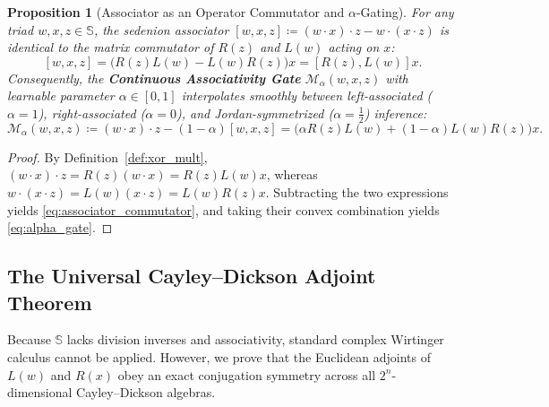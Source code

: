 \documentclass[11pt,a4paper]{article}
\newtheorem{proposition}[theorem]{Proposition}
\theoremstyle{definition}
\theoremstyle{remark}
\newcommand{\Se}{\mathbb{S}}
\begin{document}
\begin{proposition}[Associator as an Operator Commutator and $\alpha$-Gating]
\label{prop:associator}
For any triad $w, x, z \in \Se$, the sedenion associator $[w, x, z] \coloneqq (w \cdot x) \cdot z - w \cdot (x \cdot z)$ is identical to the matrix commutator of $R(z)$ and $L(w)$ acting on $x$:
\begin{equation}
\label{eq:associator_commutator}
[w, x, z] = \big(R(z)L(w) - L(w)R(z)\big)x = [R(z), L(w)]x.
\end{equation}
Consequently, the \textbf{Continuous Associativity Gate} $\mathcal{M}_\alpha(w, x, z)$ with learnable parameter $\alpha \in [0, 1]$ interpolates smoothly between left-associated ($\alpha=1$), right-associated ($\alpha=0$), and Jordan-symmetrized ($\alpha=\tfrac{1}{2}$) inference:
\begin{equation}
\label{eq:alpha_gate}
\mathcal{M}_\alpha(w, x, z) \coloneqq (w \cdot x) \cdot z - (1 - \alpha)[w, x, z] = \big(\alpha R(z)L(w) + (1 - \alpha)L(w)R(z)\big)x.
\end{equation}
\end{proposition}
\begin{proof}
By Definition~\ref{def:xor_mult}, $(w \cdot x) \cdot z = R(z)(w \cdot x) = R(z)L(w)x$, whereas $w \cdot (x \cdot z) = L(w)(x \cdot z) = L(w)R(z)x$. Subtracting the two expressions yields \eqref{eq:associator_commutator}, and taking their convex combination yields \eqref{eq:alpha_gate}.
\end{proof}

\subsection{The Universal Cayley--Dickson Adjoint Theorem}
Because $\Se$ lacks division inverses and associativity, standard complex Wirtinger calculus cannot be applied. However, we prove that the Euclidean adjoints of $L(w)$ and $R(x)$ obey an exact conjugation symmetry across all $2^n$-dimensional Cayley--Dickson algebras.
\end{document}
